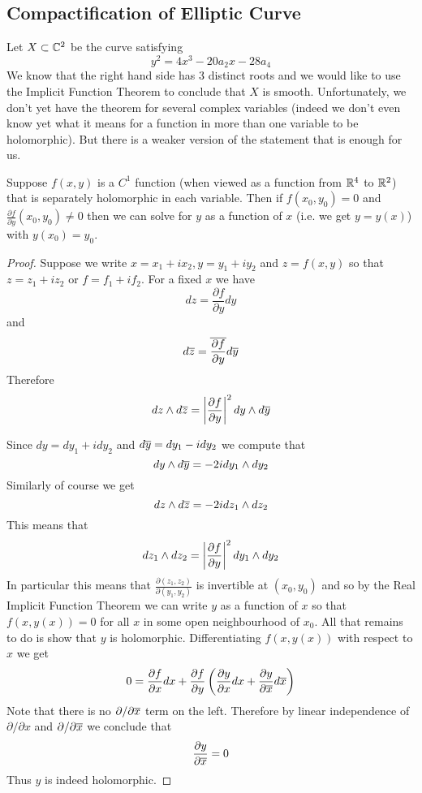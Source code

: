 \subsection{Compactification of Elliptic Curve}\label{subsec:compact-ellptc-curve}
Let $X \subset \mathbb{C}^2$ be the curve satisfying
$$y^2 = 4x^3 - 20a_2x - 28a_4$$
We know that the right hand side has 3 distinct roots and we would like to use the Implicit Function Theorem to conclude that $X$ is smooth. Unfortunately, we don't yet have the theorem for several complex variables (indeed we don't even know yet what it means for a function in more than one variable to be holomorphic). But there is a weaker version of the statement that is enough for us.
\begin{theorem}\label{thm:weak-imft}
Suppose $f(x, y)$ is a $C^1$ function (when viewed as a function from $\mathbb{R}^4$ to $\mathbb{R}^2$) that is separately holomorphic in each variable. Then if $f(x_0, y_0) = 0$ and $\frac{\partial f}{\partial y}(x_0, y_0) \neq 0$ then we can solve for $y$ as a function of $x$ (i.e. we get $y = y(x)$) with $y(x_0) = y_0$. 
\end{theorem}
\begin{proof}
    Suppose we write $x = x_1 + ix_2, y = y_1 + iy_2$ and $z = f(x, y)$ so that $z = z_1 + iz_2$ or $f = f_1 + if_2$. 
    For a fixed $x$ we have 
    $$dz = \frac{\partial f}{\partial y}dy$$
    and
    $$d\overline{z} = \overline{\frac{\partial f}{\partial y}} d\overline{y}$$
    Therefore 
    $$dz \wedge d\overline{z} = \left|\frac{\partial f}{\partial y}\right|^2 dy \wedge d \overline{y}$$

    Since $dy = dy_1 + idy_2$ and $d\overline{y} = dy_1 - i dy_2$ we compute that 
    $$dy \wedge d\overline{y} = -2i dy_1 \wedge dy_2$$
    Similarly of course we get
    $$dz \wedge d\overline{z} = -2i dz_1 \wedge dz_2$$
    This means that 
    $$dz_1 \wedge dz_2 = \left|\frac{\partial f}{\partial y}\right|^2 dy_1 \wedge dy_2$$
    In particular this means that $\frac{\partial (z_1, z_2)}{\partial (y_1, y_2)}$ is invertible at $(x_0, y_0)$ and so by the Real Implicit Function Theorem we can write $y$ as a function of $x$ so that $f(x, y(x)) = 0$ for all $x$ in some open neighbourhood of $x_0$. All that remains to do is show that $y$ is holomorphic. Differentiating $f(x, y(x))$ with respect to $x$ we get 
    \begin{align*}
        0 = \frac{\partial f}{\partial x}dx + \frac{\partial f}{\partial y} \left( \frac{\partial y}{\partial x}dx + \frac{\partial y}{\partial \overline{x}} d\overline{x} \right)
    \end{align*}
    Note that there is no $\partial/\partial \overline{x}$ term on the left. Therefore by linear independence of $\partial/\partial x$ and $\partial/\partial \overline{x}$ we conclude that 
    $$\frac{\partial y}{\partial \overline{x}} = 0$$
    Thus $y$ is indeed holomorphic.
\end{proof}

